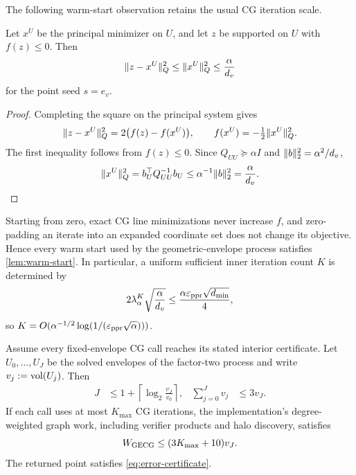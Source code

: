 \documentclass[11pt]{article}
\begin{document}
The following warm-start observation retains the usual CG iteration scale.

\begin{lemma}
\label{lem:warm-start}
Let $x^U$ be the principal minimizer on $U$, and let $z$ be supported on $U$
with $f(z)\leq0$. Then
\begin{equation}
 \lVert z-x^U\rVert_Q^2
 \leq\lVert x^U\rVert_Q^2
 \leq\frac{\alpha}{d_v}
 \label{eq:warm-start-bound}
\end{equation}
for the point seed $s=e_v$.
\end{lemma}

\begin{proof}
Completing the square on the principal system gives
\begin{equation*}
 \lVert z-x^U\rVert_Q^2=2\bigl(f(z)-f(x^U)\bigr),
 \qquad
 f(x^U)=-\tfrac12\lVert x^U\rVert_Q^2.
\end{equation*}
The first inequality follows from $f(z)\leq0$. Since
$Q_{UU}\succeq\alpha I$ and $\lVert b\rVert_2^2=\alpha^2/d_v$,
\begin{equation*}
 \lVert x^U\rVert_Q^2=b_U^\top Q_{UU}^{-1}b_U
 \leq\alpha^{-1}\lVert b\rVert_2^2=\frac{\alpha}{d_v}.
\end{equation*}
\end{proof}

Starting from zero, exact CG line minimizations never increase $f$, and
zero-padding an iterate into an expanded coordinate set does not change its
objective. Hence every warm start used by the geometric-envelope process
satisfies \cref{lem:warm-start}. In particular, a uniform sufficient inner
iteration count $K$ is determined by
\begin{equation}
 2\lambda_\alpha^K\sqrt{\frac{\alpha}{d_v}}
 \leq\frac{\alpha\varepsilon_{\mathrm{ppr}}\sqrt{d_{\min}}}{4},
 \label{eq:geometric-inner-count}
\end{equation}
so $K=O(\alpha^{-1/2}\log(1/(\varepsilon_{\mathrm{ppr}}\sqrt\alpha)))$.

\begin{theorem}
\label{thm:geometric-envelope-work}
Assume every fixed-envelope CG call reaches its stated interior certificate.
Let $U_0,\ldots,U_J$ be the solved envelopes of the factor-two process and
write $v_j:=\operatorname{vol}(U_j)$. Then
\begin{align}
 J&\leq1+\left\lceil\log_2\frac{v_J}{v_0}\right\rceil,
 &\sum_{j=0}^Jv_j&\leq3v_J.
 \label{eq:geometric-volume-ledger}
\end{align}
If each call uses at most $K_{\max}$ CG iterations, the implementation's
degree-weighted graph work, including verifier products and halo discovery,
satisfies
\begin{equation}
 W_{\rm GECG}\leq(3K_{\max}+10)v_J.
 \label{eq:geometric-work}
\end{equation}
The returned point satisfies \cref{eq:error-certificate}.
\end{theorem}
\end{document}

